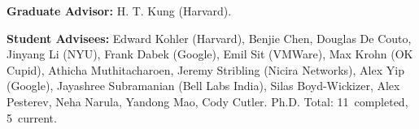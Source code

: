 \documentclass{article}
\begin{document}
\noindent\textbf{Graduate Advisor:}
    H. T. Kung (Harvard).

\noindent\textbf{Student Advisees:}
    Edward Kohler (Harvard),
    Benjie Chen,
    Douglas De Couto,
    Jinyang Li (NYU),
    Frank Dabek (Google),
    Emil Sit (VMWare),
    Max Krohn (OK Cupid),
    Athicha Muthitacharoen,
    Jeremy Stribling (Nicira Networks),
    Alex Yip (Google),
    Jayashree Subramanian (Bell Labs India),
    Silas Boyd-Wickizer,
    Alex Pesterev,
    Neha Narula,
    Yandong Mao,
    Cody Cutler.
    Ph.D. Total: 11~completed, 5~current.
\end{document}
